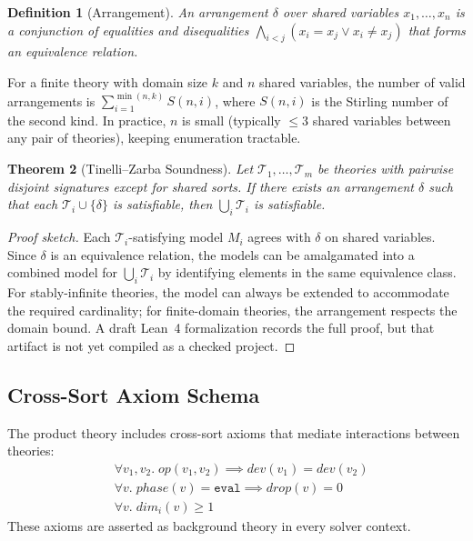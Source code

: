 \documentclass[11pt]{article}
\newtheorem{theorem}{Theorem}
\newtheorem{definition}[theorem]{Definition}
\begin{document}
\begin{definition}[Arrangement]
An \emph{arrangement} $\delta$ over shared variables
$x_1, \ldots, x_n$ is a conjunction of equalities and disequalities
$\bigwedge_{i < j} (x_i = x_j \lor x_i \neq x_j)$ that forms an
equivalence relation.
\end{definition}

For a finite theory with domain size $k$ and $n$ shared variables,
the number of valid arrangements is $\sum_{i=1}^{\min(n,k)} S(n, i)$,
where $S(n,i)$ is the Stirling number of the second kind.
In practice, $n$ is small (typically $\leq 3$
shared variables between any pair of theories), keeping enumeration
tractable.

\begin{theorem}[Tinelli--Zarba Soundness]
Let $\mathcal{T}_1, \ldots, \mathcal{T}_m$ be theories with pairwise
disjoint signatures except for shared sorts.  If there exists an
arrangement $\delta$ such that each $\mathcal{T}_i \cup \{\delta\}$
is satisfiable, then $\bigcup_i \mathcal{T}_i$ is satisfiable.
\end{theorem}

\begin{proof}[Proof sketch]
Each $\mathcal{T}_i$-satisfying model $M_i$ agrees with $\delta$
on shared variables.  Since $\delta$ is an equivalence relation,
the models can be amalgamated into a combined model for
$\bigcup_i \mathcal{T}_i$ by identifying elements in the same
equivalence class.  For stably-infinite theories, the model can
always be extended to accommodate the required cardinality; for
finite-domain theories, the arrangement respects the domain bound.
A draft Lean~4 formalization records the full proof, but that artifact
is not yet compiled as a checked project.
\end{proof}


\subsection{Cross-Sort Axiom Schema}

The product theory includes cross-sort axioms that mediate
interactions between theories:
\begin{align}
  &\forall v_1, v_2.\; \mathit{op}(v_1, v_2) \implies
    \mathit{dev}(v_1) = \mathit{dev}(v_2)
    \tag{DeviceCompat} \\
  &\forall v.\; \mathit{phase}(v) = \texttt{eval} \implies
    \mathit{drop}(v) = 0
    \tag{PhaseDrop} \\
  &\forall v.\; \mathit{dim}_i(v) \geq 1
    \tag{PosDim}
\end{align}
These axioms are asserted as background theory in every solver
context.
\end{document}
